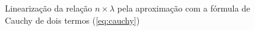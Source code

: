 \begin{figure}[H]
	\centering

	

	\caption{Linearização da relação $n\times\lambda$ pela aproximação com a fórmula de Cauchy de dois termos (\ref{eq:cauchy})}
	\label{fig:reta}
\end{figure}